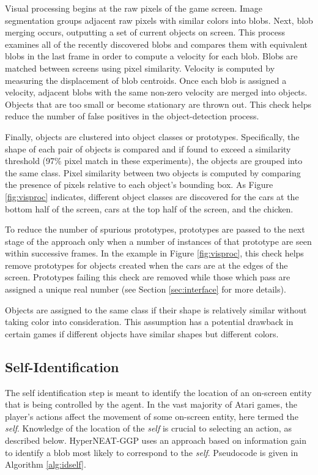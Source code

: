 \documentclass{acm_proc_article-sp}
\begin{document}
Visual processing begins at the raw pixels of the game screen. Image segmentation groups adjacent raw pixels with similar colors into blobs. Next, blob merging occurs, outputting a set of current objects on screen. This process examines all of the recently discovered blobs and compares them with equivalent blobs in the last frame in order to compute a velocity for each blob. Blobs are matched between screens using pixel similarity. Velocity is computed by measuring the displacement of blob centroids. Once each blob is assigned a velocity, adjacent blobs with the same non-zero velocity are merged into objects. Objects that are too small or become stationary are thrown out. This check helps reduce the number of false positives in the object-detection process.

Finally, objects are clustered into object classes or prototypes. Specifically, the shape of each pair of objects is compared and if found to exceed a similarity threshold (97\% pixel match in these experiments), the objects are grouped into the same class. Pixel similarity between two objects is computed by comparing the presence of pixels relative to each object's bounding box. As Figure \ref{fig:visproc} indicates, different object classes are discovered for the cars at the bottom half of the screen, cars at the top half of the screen, and the chicken. 

To reduce the number of spurious prototypes, prototypes are passed to the next stage of the approach only when a number of instances of that prototype are seen within successive frames. In the example in Figure \ref{fig:visproc}, this check helps remove prototypes for objects created when the cars are at the edges of the screen. Prototypes failing this check are removed while those which pass are assigned a unique real number (see Section \ref{sec:interface} for more details).

Objects are assigned to the same class if their shape is relatively similar without taking color into consideration. This assumption has a potential drawback in certain games if different objects have similar shapes but different colors. 

\subsection{Self-Identification}
The self identification step is meant to identify the location of an on-screen entity that is being controlled by the agent. In the vast majority of Atari games, the player's actions affect the movement of some on-screen entity, here termed the \textit{self}. Knowledge of the location of the \textit{self} is crucial to selecting an action, as described below. HyperNEAT-GGP uses an approach based on information gain to identify a blob most likely to correspond to the \textit{self}. Pseudocode is given in Algorithm \ref{alg:idself}.
\end{document}
